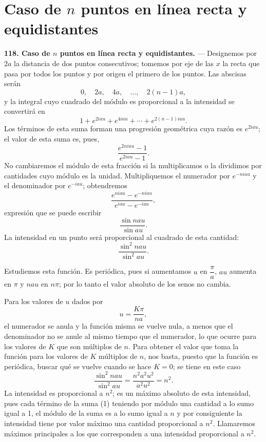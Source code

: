 \section{Caso de \texorpdfstring{$n$}{n} puntos en línea recta y
equidistantes}

\noindent\textbf{118. Caso de $n$ puntos en línea recta y equidistantes.}
— Designemos por $2a$ la distancia de dos puntos consecutivos; tomemos
por eje de las $x$ la recta que pasa por todos los puntos y por origen el
primero de los puntos. Las abscisas serán
\[
0,\quad 2a,\quad 4a,\quad\ldots,\quad 2(n-1)a,
\]
y la integral cuyo cuadrado del módulo es proporcional a la intensidad se
convertirá en
\begin{equation}
1+e^{2iau}+e^{4iau}+\cdots+e^{2(n-1)iau}.
\tag{1}
\end{equation}
Los términos de esta suma forman una progresión geométrica cuya razón es
$e^{2iau}$; el valor de esta suma es, pues,
\[
\frac{e^{2niau}-1}{e^{2iau}-1}.
\]
No cambiaremos el módulo de esta fracción si la multiplicamos o la
dividimos por cantidades cuyo módulo es la unidad. Multipliquemos el
numerador por $e^{-niau}$ y el denominador por $e^{-iau}$; obtendremos
\[
\frac{e^{niau}-e^{-niau}}{e^{iau}-e^{-iau}},
\]
expresión que se puede escribir
\[
\frac{\sin nau}{\sin au}.
\]
La intensidad en un punto será proporcional al cuadrado de esta cantidad:
\begin{equation}
\frac{\sin^2 nau}{\sin^2 au}.
\tag{2}
\end{equation}

Estudiemos esta función. Es periódica, pues si aumentamos $u$ en
$\dfrac{\pi}{a}$, $au$ aumenta en $\pi$ y $nau$ en $n\pi$; por lo tanto el
valor absoluto de los senos no cambia.

Para los valores de $u$ dados por
\[
u=\frac{K\pi}{na},
\]
el numerador se anula y la función misma se vuelve nula, a menos que el
denominador no se anule al mismo tiempo que el numerador, lo que ocurre
para los valores de $K$ que son múltiplos de $n$. Para obtener el valor
que toma la función para los valores de $K$ múltiplos de $n$, nos basta,
puesto que la función es periódica, buscar qué se vuelve cuando se hace
$K=0$; se tiene en este caso
\[
\frac{\sin^2 nau}{\sin^2 au} = \frac{n^2a^2u^2}{a^2u^2} = n^2.
\]
La intensidad es proporcional a $n^2$; es un máximo absoluto de esta
intensidad, pues cada término de la suma (1) teniendo por módulo una
cantidad a lo sumo igual a 1, el módulo de la suma es a lo sumo igual a
$n$ y por consiguiente la intensidad tiene por valor máximo una cantidad
proporcional a $n^2$. Llamaremos máximos principales a los que
corresponden a una intensidad proporcional a $n^2$.

